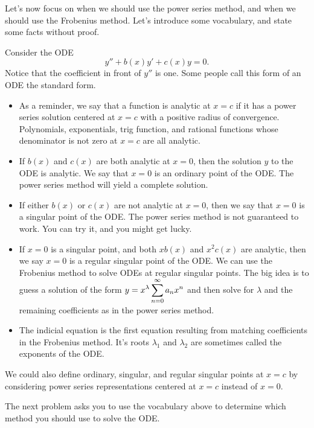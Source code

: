 Let's now focus on when we should use the power series method, and when we should use the Frobenius method. Let's introduce some vocabulary, and state some facts without proof.

\begin{definition}
Consider the ODE 
$$y''+b(x)y'+c(x)y=0.$$
Notice that the coefficient in front of $y''$ is one. Some people call this form of an ODE the standard form.
\begin{itemize}
 \item As a reminder, we say that a function is analytic at $x=c$ if it has a power series solution centered at $x=c$ with a positive radius of convergence.  Polynomials, exponentials, trig function, and rational functions whose denominator is not zero at $x=c$ are all analytic.
 \item If $b(x)$ and $c(x)$ are both analytic at $x=0$, then the solution $y$ to the ODE is analytic. We say that $x=0$ is an ordinary point of the ODE. The power series method will yield a complete solution. 
 \item If either $b(x)$ or $c(x)$ are not analytic at $x=0$, then we say that $x=0$ is a singular point of the ODE.  The power series method is not guaranteed to work. You can try it, and you might get lucky. 
 \item If $x=0$ is a singular point, and both $xb(x)$ and $x^2c(x)$ are analytic, then we say $x=0$ is a regular singular point of the ODE. We can use the Frobenius method to solve ODEs at regular singular points. The big idea is to guess a solution of the form $\displaystyle y = x^\lambda \sum_{n=0}^\infty a_n x^n$ and then solve for $\lambda$ and the remaining coefficients as in the power series method.  
 \item The indicial equation is the first equation resulting from matching coefficients in the Frobenius method. It's roots $\lambda_1$ and $\lambda_2$ are sometimes called the exponents of the ODE.
\end{itemize}
We could also define ordinary, singular, and regular singular points at $x=c$ by considering power series representations centered at $x=c$ instead of $x=0$.
\end{definition}

The next problem asks you to use the vocabulary above to determine which method you should use to solve the ODE.

